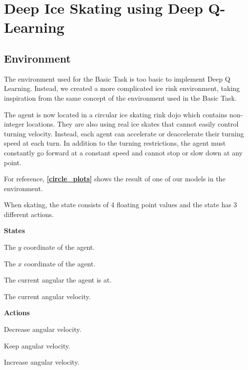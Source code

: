 \renewcommand{\thesection}{Advanced Task}
\section{Deep Ice Skating using Deep Q-Learning}
\subsection{Environment}
The environment used for the Basic Task is too basic to implement Deep Q Learning. Instead, we created a more complicated ice rink environment, taking inspiration from the  same concept of the environment used in the Basic Task.

The agent is now located in a circular ice skating rink dojo which contains non-integer locations.
They are also using real ice skates that cannot easily control turning velocity.
Instead, each agent can accelerate or deaccelerate their turning speed at each turn.
In addition to the turning restrictions, the agent must constantly go forward at a constant speed and cannot stop or slow down at any point.

For reference, \textbf{\cref{circle_plots}} shows the result of one of our models in the environment.

When skating, the state consists of 4 floating point values and the state has 3 different actions.

\begin{center}
	\begin{minipage}[t]{.48\textwidth}
		\begin{center}
			\textbf{States}
		\end{center}
		\begin{description}[noitemsep,style=nextline]
			\item[\bm{$y$}] The $y$ coordinate of the agent.
			\item[\bm{$x$}] The $x$ coordinate of the agent.
			\item[\bm{$\varphi$}] The current angular the agent is at.
			\item[\bm{$\theta$}] The current angular velocity.
		\end{description}
	\end{minipage}
	\begin{minipage}[t]{.48\textwidth}
		\begin{center}
			\textbf{Actions}
		\end{center}
		\begin{description}[noitemsep]
			\item[0. Turn Left] Decrease angular velocity.
			\item[1. Stay Put] Keep angular velocity.
			\item[2. Turn Right] Increase angular velocity.
		\end{description}
	\end{minipage}
\end{center}


